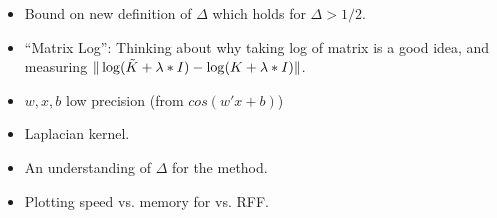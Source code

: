 \begin{itemize}
	\item Bound on new definition of $\Delta$ which holds for $\Delta > 1/2$.
	\item ``Matrix Log'': Thinking about why taking log of matrix is a good idea, and measuring $\|\log(\tilde{K} + \lambda * I) - \log(K + \lambda * I)\|$.
	\item $w,x,b$ low precision (from $cos(w'x + b)$)
	\item Laplacian kernel.
	\item An understanding of $\Delta$ for the \Nystrom method.
	\item Plotting speed vs. memory for \Nystrom vs. RFF.
\end{itemize}